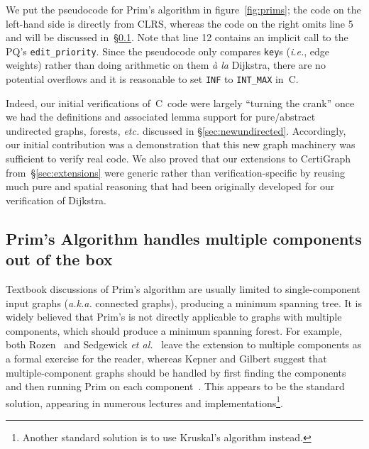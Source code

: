 We put the pseudocode for Prim's algorithm in figure~\ref{fig:prims}; the code on the left-hand side is directly from CLRS, whereas the code on the right omits line 5 and will be discussed in~\S\ref{sec:primforest}.  Note that line 12 contains an implicit call to the PQ's \texttt{edit\_priority}.  Since the pseudocode only compares \texttt{key}s (\emph{i.e.}, edge weights) rather than doing arithmetic on them \emph{\`a la} Dijkstra, there are no potential overflows and it is reasonable to set \texttt{INF} to \texttt{INT\_MAX} in~C.

Indeed, our initial verifications of~C~code were largely ``turning the crank'' once we had the definitions and associated lemma support for pure/abstract undirected graphs, forests, \emph{etc.} discussed in \S\ref{sec:newundirected}.  Accordingly, our initial contribution was a demonstration that this new graph machinery was sufficient to verify real code.  We also proved that our extensions to CertiGraph from~\S\ref{sec:extensions} were generic rather than verification-specific by reusing much pure and spatial reasoning that had been originally developed for our verification of Dijkstra.


\subsection{Prim's Algorithm handles multiple components out of the box}
\label{sec:primforest}


Textbook discussions of Prim's algorithm are usually limited to single-component input graphs (\emph{a.k.a.} connected graphs), producing a minimum spanning tree.  It is widely believed that Prim's is not directly applicable to graphs with multiple components, which should produce a minimum spanning forest.  For example, both Rozen~\cite{rozen} and Sedgewick \emph{et al.}~\cite{sedgewick,DBLP:books/daglib/0029345} leave the extension to multiple components as a formal exercise for the reader, whereas Kepner and Gilbert suggest that multiple-component graphs should be handled by first finding the components and then running Prim on each component~\cite{kepnergilbert}.  This appears to be the standard solution, appearing in numerous lectures and implementations\footnote{Another standard solution is to use Kruskal's  algorithm instead.}. %

